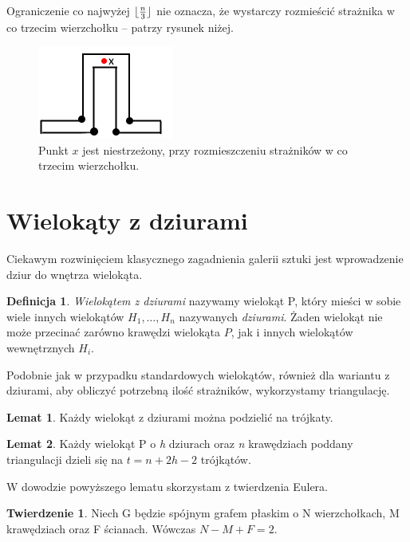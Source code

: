 \documentclass[brudnopis]{xmgr}
\DeclarePairedDelimiter\floor{\lfloor}{\rfloor}
\theoremstyle{definition}
\newtheorem{Twierdzenie}{Twierdzenie}
\newtheorem{Lemat}{Lemat}
\newtheorem{Definicja}{Definicja}
\begin{document}
\indent Ograniczenie co najwyżej $\floor{\frac{n}{3}}$ nie oznacza, że wystarczy rozmieścić strażnika w co trzecim wierzchołku -- patrzy rysunek niżej.
\begin{figure}[ht!]
  \centering
  \includegraphics{rysunki/co_trzeci.png}
  \caption{Punkt $x$ jest niestrzeżony, przy rozmieszczeniu strażników w co trzecim wierzchołku.}
\end{figure} 

\section{Wielokąty z dziurami}
Ciekawym rozwinięciem klasycznego zagadnienia galerii sztuki jest wprowadzenie dziur do wnętrza wielokąta.

\begin{Definicja} \label{def wielokat z dziurami}
  \emph{Wielokątem z dziurami} nazywamy wielokąt P, który mieści w sobie wiele innych wielokątów $H_1, \ldots, H_n$ nazywanych \emph{dziurami}. Żaden wielokąt nie może przecinać zarówno krawędzi wielokąta $P$, jak i innych wielokątów wewnętrznych $H_i$.
\end{Definicja}

\indent Podobnie jak w przypadku standardowych wielokątów, również dla wariantu z dziurami, aby obliczyć potrzebną ilość strażników, wykorzystamy triangulację.

\begin{Lemat} \cite{orourke}
  Każdy wielokąt z dziurami można podzielić na trójkaty.
\end{Lemat}

\begin{Lemat}\label{t trójkątów triangulacja} \cite{orourke}
  Każdy wielokąt P o \emph{h} dziurach oraz \emph{n} krawędziach poddany triangulacji dzieli się na $t = n + 2h - 2$ trójkątów.
\end{Lemat}

W dowodzie powyższego lematu skorzystam z twierdzenia Eulera.
\begin{Twierdzenie} \label{tw eulera} \cite{euler}
  Niech G będzie spójnym grafem płaskim o N wierzchołkach, M krawędziach oraz F ścianach. Wówczas $N - M + F = 2$.
\end{Twierdzenie}
\end{document}
